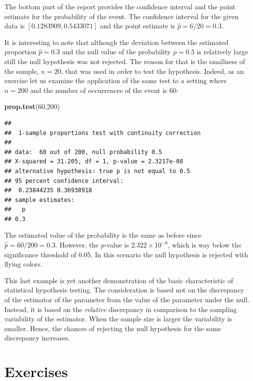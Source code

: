 \documentclass[]{krantz}
\makeatletter
\newenvironment{Shaded}{\begin{snugshade}}{\end{snugshade}}
\newcommand{\KeywordTok}[1]{\textcolor[rgb]{0.13,0.29,0.53}{\textbf{#1}}}
\newcommand{\DecValTok}[1]{\textcolor[rgb]{0.00,0.00,0.81}{#1}}
\newcommand{\NormalTok}[1]{#1}
\newenvironment{kframe}{%
\medskip{}
\setlength{\fboxsep}{.8em}
 \def\at@end@of@kframe{}%
 \ifinner\ifhmode%
  \def\at@end@of@kframe{\end{minipage}}%
  \begin{minipage}{\columnwidth}%
 \fi\fi%
 \def\FrameCommand##1{\hskip\@totalleftmargin \hskip-\fboxsep
 \colorbox{shadecolor}{##1}\hskip-\fboxsep
     \hskip-\linewidth \hskip-\@totalleftmargin \hskip\columnwidth}%
 \MakeFramed {\advance\hsize-\width
   \@totalleftmargin\z@ \linewidth\hsize
   \@setminipage}}%
 {\par\unskip\endMakeFramed%
 \at@end@of@kframe}
\renewenvironment{Shaded}{\begin{kframe}}{\end{kframe}}
\theoremstyle{definition}
\theoremstyle{definition}
\theoremstyle{definition}
\theoremstyle{remark}
\makeatother
\begin{document}
The bottom part of the report provides the confidence interval and the
point estimate for the probability of the event. The confidence interval
for the given data is \([0.1283909, 0.5433071]\) and the point estimate
is \(\hat p = 6/20 = 0.3\).

It is interesting to note that although the deviation between the
estimated proportion \(\hat p = 0.3\) and the null value of the
probability \(p = 0.5\) is relatively large still the null hypothesis
was not rejected. The reason for that is the smallness of the sample,
\(n = 20\), that was used in order to test the hypothesis. Indeed, as an
exercise let us examine the application of the same test to a setting
where \(n = 200\) and the number of occurrences of the event is 60:

\begin{Shaded}
\begin{Highlighting}[]
\KeywordTok{prop.test}\NormalTok{(}\DecValTok{60}\NormalTok{,}\DecValTok{200}\NormalTok{)}
\end{Highlighting}
\end{Shaded}

\begin{verbatim}
## 
##  1-sample proportions test with continuity correction
## 
## data:  60 out of 200, null probability 0.5
## X-squared = 31.205, df = 1, p-value = 2.3217e-08
## alternative hypothesis: true p is not equal to 0.5
## 95 percent confidence interval:
##  0.23844235 0.36938918
## sample estimates:
##   p 
## 0.3
\end{verbatim}

The estimated value of the probability is the same as before since
\(\hat p = 60/200 = 0.3\). However, the \(p\)-value is
\(2.322 \times 10^{-8}\), which is way below the significance threshold
of 0.05. In this scenario the null hypothesis is rejected with flying
colors.

This last example is yet another demonstration of the basic
characteristic of statistical hypothesis testing. The consideration is
based not on the discrepancy of the estimator of the parameter from the
value of the parameter under the null. Instead, it is based on the
\emph{relative} discrepancy in comparison to the sampling variability of
the estimator. When the sample size is larger the variability is
smaller. Hence, the chances of rejecting the null hypothesis for the
same discrepancy increases.

\section{Exercises}\label{exercises-7}
\end{document}
